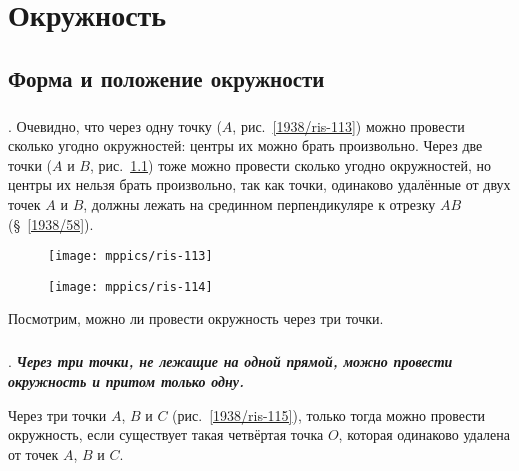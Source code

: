 \chapter{Окружность}

\section{Форма и положение окружности}

\paragraph{}\label{1938/103}
.
Очевидно, что через одну точку ($A$, рис.~\ref{1938/ris-113}) можно провести сколько угодно окружностей:
центры их можно брать произвольно.
Через две точки ($A$ и $B$, рис.~\ref{1938/ris-114}) тоже можно провести сколько угодно окружностей, но центры их нельзя брать произвольно, так как точки, одинаково удалённые от двух точек $A$ и $B$, должны лежать на срединном перпендикуляре к отрезку $AB$ (§~\ref{1938/58}). 

\begin{figure}[!ht]
\begin{minipage}{.48\textwidth}
\centering
\texttt{[image: mppics/ris-113]}
\end{minipage}
\hfill
\begin{minipage}{.48\textwidth}
\centering
\texttt{[image: mppics/ris-114]}
\end{minipage}

\medskip

\begin{minipage}{.48\textwidth}
\centering
\caption{}\label{1938/ris-113}
\end{minipage}
\hfill
\begin{minipage}{.48\textwidth}
\centering
\caption{}\label{1938/ris-114}
\end{minipage}
\vskip-4mm
\end{figure}

Посмотрим, можно ли провести окружность через три точки.

\paragraph{}\label{1938/104}
.
\textbf{\emph{Через три точки, не лежащие на одной прямой, можно провести окружность и притом только одну.}}

Через три точки $A$, $B$ и $C$ (рис.~\ref{1938/ris-115}), только тогда можно провести окружность, если существует такая четвёртая точка $O$, которая одинаково удалена от точек $A$, $B$ и $C$.

